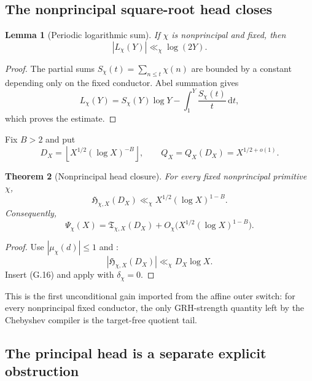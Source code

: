 \documentclass[11pt]{article}
\newtheorem{theorem}{Theorem}[section]
\newtheorem{lemma}[theorem]{Lemma}
\theoremstyle{definition}
\theoremstyle{remark}
\newcommand{\dd}{\mathrm d}
\begin{document}
\subsection{The nonprincipal square-root head closes}
\label{subsec:grhouter-nonprincipal-head}

\begin{lemma}[Periodic logarithmic sum]
\label{lem:grhouter-periodic-log}
If \(\chi\) is nonprincipal and fixed, then
\[
 \boxed{|L_\chi(Y)|\ll_\chi\log(2Y).}
 \tag{G.15}
\]
\end{lemma}

\begin{proof}
The partial sums \(S_\chi(t)=\sum_{n\le t}\chi(n)\) are bounded by a
constant depending only on the fixed conductor.  Abel summation gives
\[
 L_\chi(Y)=S_\chi(Y)\log Y-
 \int_1^Y\frac{S_\chi(t)}{t}\,\dd t,
\]
which proves the estimate.
\end{proof}

Fix \(B>2\) and put
\[
 \boxed{
 D_X=\left\lfloor X^{1/2}(\log X)^{-B}\right\rfloor,
 \qquad
 Q_X=Q_X(D_X)=X^{1/2+o(1)}.}
 \tag{G.16}
\]

\begin{theorem}[Nonprincipal head closure]
\label{thm:grhouter-nonprincipal-head}
For every fixed nonprincipal primitive \(\chi\),
\[
 \boxed{
 \mathfrak H_{\chi,X}(D_X)
 \ll_\chi X^{1/2}(\log X)^{1-B}.}
 \tag{G.17}
\]
Consequently,
\[
 \boxed{
 \Psi_\chi(X)
 =\mathfrak T_{\chi,X}(D_X)
  +O_\chi\bigl(X^{1/2}(\log X)^{1-B}\bigr).}
 \tag{G.18}
\]
\end{theorem}

\begin{proof}
Use \(|\mu_\chi(d)|\le1\) and
:
\[
 |\mathfrak H_{\chi,X}(D_X)|
 \ll_\chi D_X\log X.
\]
Insert \textup{(G.16)} and apply  with
\(\delta_\chi=0\).
\end{proof}

This is the first unconditional gain imported from the affine outer switch:
for every nonprincipal fixed conductor, the only GRH-strength quantity left
by the Chebyshev compiler is the target-free quotient tail.

\subsection{The principal head is a separate explicit obstruction}
\label{subsec:grhouter-principal-head}
\end{document}
